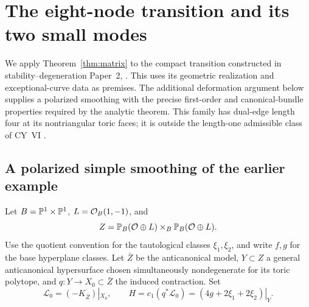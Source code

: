 \section{The eight-node transition and its two small modes}\label{sec:eight-node}

We apply Theorem~\ref{thm:matrix} to the compact transition constructed
in stability--degeneration Paper~2,
\cite[Appendix~A, Proposition~A.1]{wuebben-chambers}. This uses its
geometric realization and exceptional-curve data as premises. The
additional deformation argument below supplies a polarized smoothing
with the precise first-order and canonical-bundle properties required
by the analytic theorem.
This family has dual-edge length four at its nontriangular toric faces;
it is outside the length-one admissible class of CY~VI
\cite[Definition~2.1]{wuebben-cy-mirror}.

\subsection{A polarized simple smoothing of the earlier example}
Let $B=\mathbb P^1\times\mathbb P^1$, $L=\mathcal O_B(1,-1)$, and
\begin{equation}\label{eq:eight-ambient}
 Z=\mathbb P_B(\mathcal O\oplus L)\times_B\mathbb P_B(\mathcal O\oplus L).
\end{equation}
Use the quotient convention for the tautological classes $\xi_1,\xi_2$,
and write $f,g$ for the base hyperplane classes. Let $\bar Z$ be the
anticanonical model, $Y\subset Z$ a general anticanonical hypersurface
chosen simultaneously nondegenerate for its toric polytope, and
$q:Y\to X_0\subset\bar Z$ the induced contraction. Set
\begin{equation}\label{eq:eight-polarization}
 \mathcal L_0=(-K_{\bar Z})|_{X_0},\qquad
 H=c_1(q^*\mathcal L_0)=(4g+2\xi_1+2\xi_2)|_Y.
\end{equation}

